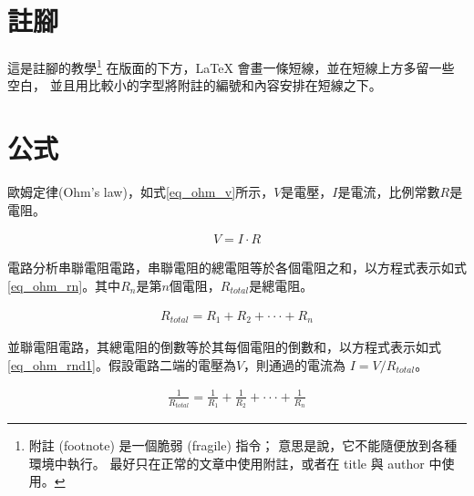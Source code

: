



\newpage
\section{註腳}
這是註腳的教學\footnote{附註 (footnote) 是一個脆弱 (fragile) 指令； 意思是說，它不能隨便放到各種環境中執行。 最好只在正常的文章中使用附註，或者在 title 與 author 中使用。}
在版面的下方，LaTeX 會畫一條短線，並在短線上方多留一些空白， 並且用比較小的字型將附註的編號和內容安排在短線之下。
\newpage

\section{公式}

歐姆定律(Ohm's law)，如式\ref{eq_ohm_v}所示，$V$是電壓，$I$是電流，比例常數$R$是電阻。

\begin{equation}\label{eq_ohm_v}
    \begin{split}
        V = I \cdot R
    \end{split}
\end{equation}

電路分析串聯電阻電路，串聯電阻的總電阻等於各個電阻之和，以方程式表示如式\ref{eq_ohm_rn}。其中$R_{n}$是第$n$個電阻，$R_{total}$是總電阻。

\begin{equation}\label{eq_ohm_rn}
    \begin{split}
        R_{total} = R_{1} + R_{2} + \cdot\cdot\cdot + R_{n}
    \end{split}
\end{equation}

並聯電阻電路，其總電阻的倒數等於其每個電阻的倒數和，以方程式表示如式\ref{eq_ohm_rnd1}。假設電路二端的電壓為$V$，則通過的電流為 $I = V / R_{total}$。

\begin{equation}\label{eq_ohm_rnd1}
    \begin{split}
        \frac{1}{R_{total}} = \frac{1}{R_{1}} + \frac{1}{R_{2}} + \cdot\cdot\cdot + \frac{1}{R_{n}}
    \end{split}
\end{equation}


